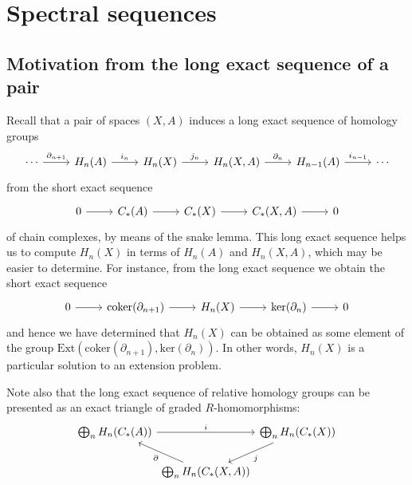 \documentclass{article}
\begin{document}
\section{Spectral sequences}

\subsection{Motivation from the long exact sequence of a pair}

Recall that a pair of spaces $(X,A)$ induces a long exact sequence of homology
groups
\begin{equation*}
\begin{tikzcd}
\cdots \arrow[r,"\partial_{n+1}"]
& H_n(A) \arrow[r,"i_n"]
& H_n(X) \arrow[r,"j_n"]
& H_n(X,A) \arrow[r,"\partial_n"]
& H_{n-1}(A) \arrow[r,"i_{n-1}"]
& \cdots
\end{tikzcd}
\end{equation*}
from the short exact sequence
\begin{equation*}
\begin{tikzcd}
0 \arrow[r] & C_\ast(A) \arrow[r] & C_\ast(X) \arrow[r] & C_\ast(X,A) \arrow[r] & 0
\end{tikzcd}
\end{equation*}
of chain complexes, by means of the snake lemma. This long exact sequence helps
us to compute $H_n(X)$ in terms of $H_n(A)$ and $H_n(X,A)$, which may be easier
to determine. For instance, from the long exact sequence we obtain the short
exact sequence
\begin{equation*}
\begin{tikzcd}
0 \arrow[r] & \mathrm{coker}(\partial_{n+1}) \arrow[r] & H_n(X) \arrow[r] & \mathrm{ker}(\partial_n) \arrow[r] & 0
\end{tikzcd}
\end{equation*}
and hence we have determined that $H_n(X)$ can be obtained as some element of the
group $\mathrm{Ext}(\mathrm{coker}(\partial_{n+1}),\mathrm{ker}(\partial_n))$.
In other words, $H_n(X)$ is a particular solution to an extension problem.

Note also that the long exact sequence of relative homology groups can be
presented as an exact triangle of graded $R$-homomorphisms:
\begin{equation*}
\begin{tikzcd}[column sep=0em]
\bigoplus_n H_n(C_\ast(A)) 
\arrow[rr,"i"] & & \bigoplus_n H_n(C_\ast(X)) \arrow[dl,"j"] \\
& \bigoplus_n H_n(C_\ast(X,A)) \arrow[ul,"\partial"]
\end{tikzcd}
\end{equation*}
\end{document}
